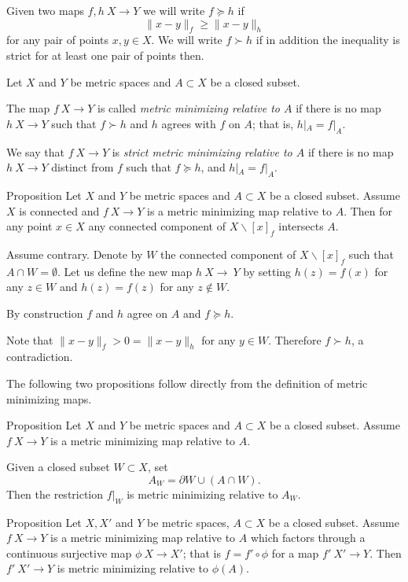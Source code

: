 \documentclass[a4paper,10pt]{amsart}
\begin{document}
Given two maps $f,h\:X\to Y$ we will write $f\succcurlyeq h$ if 
\[\|x-y\|_f\ge \|x-y\|_h\]
for any pair of points $x,y\in X$.
We will write $f\succ h$ 
if in addition the inequality is strict for at least one pair of points then.



Let $X$ and $Y$ be metric spaces and $A\subset X$ be a closed subset.

The map $f\:X\to Y$ is called \emph{metric minimizing relative to $A$}
if there is no map $h\:X\to Y$ such that $f\succ h$
and $h$ agrees with $f$ on $A$;
that is, $h|_A=f|_A$.

We say that $f\:X\to Y$ is \emph{strict metric minimizing relative to $A$}
if there is no map $h\:X\to Y$ distinct from $f$
such that $f\succcurlyeq h$, 
and $h|_A=f|_A$.

\begin{thm}{Proposition}\label{prop:point-complement}
Let $X$ and $Y$ be metric spaces 
and $A\subset X$ be a closed subset.
Assume $X$ is connected and $f\:X\to Y$ is a metric minimizing map relative to $A$.
Then for any point $x\in X$ any connected component of $X\backslash [x]_f$ intersects $A$.

\end{thm}

Assume contrary.
Denote by $W$ the connected component of $X\backslash [x]_f$ such that $A\cap W=\emptyset$.
Let us define the new map $h\:X\to\ Y$ 
by setting $h(z)=f(x)$ for any $z\in W$
and $h(z)=f(z)$ for any $z\notin W$.

By construction $f$ and $h$ agree on $A$ and $f\succcurlyeq h$.

Note that $\|x-y\|_f>0=\|x-y\|_h$ for any $y\in W$.
Therefore $f\succ h$, a contradiction.
\qeds

The following two propositions follow directly from the definition of metric minimizing maps.

\begin{thm}{Proposition}\label{prop:subset}
Let $X$ and $Y$ be metric spaces and $A\subset X$ be a closed subset.
Assume $f\:X\to Y$ is a metric minimizing map relative to $A$.

Given a closed subset $W\subset X$, set 
\[A_W=\partial W\cup (A\cap W).\]
Then the restriction $f|_W$ is metric minimizing relative to $A_W$.
\end{thm}

\begin{thm}{Proposition}\label{prop:factor}
Let $X, X'$ and $Y$ be metric spaces, 
$A\subset X$ be a closed subset.
Assume $f\:X\to Y$ is a metric minimizing map relative to $A$
which factors through a continuous surjective map $\phi\:X\to X'$;
that is $f=f'\circ\phi$ for a map $f'\:X'\to Y$.
Then $f'\:X'\to Y$ is metric minimizing relative to $\phi(A)$.
\end{thm}
\end{document}
